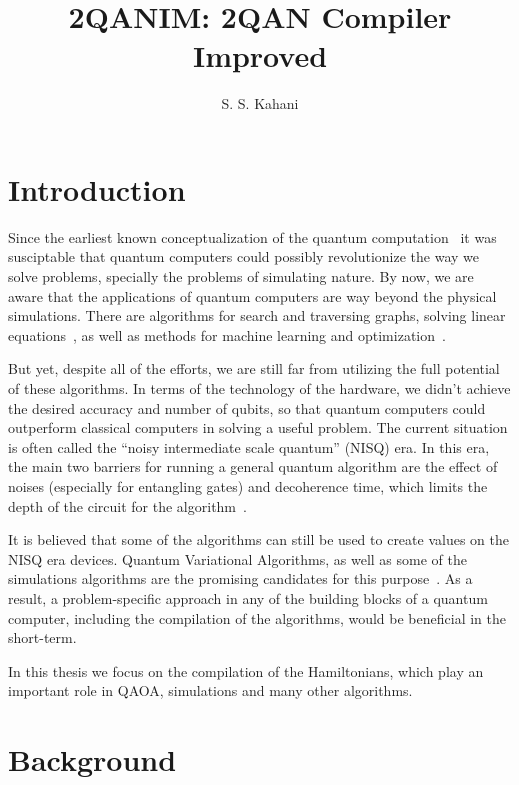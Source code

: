 \documentclass{book}
\title{2QANIM: 2QAN Compiler Improved}
\author{S. S. Kahani}
\begin{document}
\maketitle
\begin{abstract}
\end{abstract}

\section{Introduction}

Since the earliest known conceptualization of the quantum computation~\cite{feynman1982} it was susciptable that quantum computers could possibly revolutionize the way we solve problems, specially the problems of simulating nature. By now, we are aware that the applications of quantum computers are way beyond the physical simulations. There are algorithms for search and traversing graphs, solving linear equations~\cite{montanaro2016}, as well as methods for machine learning and optimization~\cite{jordan_quantum_algorithms_zoo_TODO}.

But yet, despite all of the efforts, we are still far from utilizing the full potential of these algorithms. In terms of the technology of the hardware, we didn't achieve the desired accuracy and number of qubits, so that quantum computers could outperform classical computers in solving a useful problem. The current situation is often called the ``noisy intermediate scale quantum'' (NISQ) era. In this era, the main two barriers for running a general quantum algorithm are the effect of noises (especially for entangling gates) and decoherence time, which limits the depth of the circuit for the algorithm~\cite{preskill2018}.

It is believed that some of the algorithms can still be used to create values on the NISQ era devices. Quantum Variational Algorithms, as well as some of the simulations algorithms are the promising candidates for this purpose~\cite{preskill2018, langione2019}. As a result, a problem-specific approach in any of the building blocks of a quantum computer, including the compilation of the algorithms, would be beneficial in the short-term.

In this thesis we focus on the compilation of the Hamiltonians, which play an important role in QAOA, simulations and many other algorithms. 

\section{Background}
\end{document}
